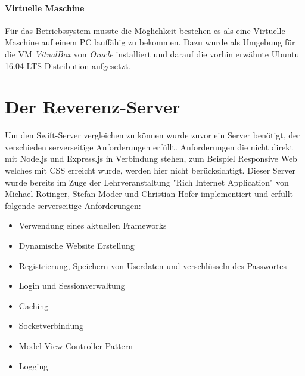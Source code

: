 \paragraph{Virtuelle Maschine}
Für das Betriebssystem musste die Möglichkeit bestehen es als eine Virtuelle Maschine auf einem PC lauffähig zu bekommen. Dazu wurde als Umgebung für die VM \textit{VitualBox} von \textit{Oracle} installiert und darauf die vorhin erwähnte Ubuntu 16.04 LTS Distribution aufgesetzt.

\section{Der Reverenz-Server}
\label{sec:derreverenzserver}

Um den Swift-Server vergleichen zu können wurde zuvor ein Server benötigt, der verschieden serverseitige Anforderungen erfüllt. Anforderungen die nicht direkt mit Node.js und Express.js in Verbindung stehen, zum Beispiel Responsive Web welches mit CSS erreicht wurde, werden hier nicht berücksichtigt. Dieser Server wurde bereits im Zuge der Lehrveranstaltung "Rich Internet Application" von Michael Rotinger, Stefan Moder und Christian Hofer implementiert und erfüllt folgende serverseitige Anforderungen: 
\begin{itemize}
	\item Verwendung eines aktuellen Frameworks
	\item Dynamische Website Erstellung
	\item Registrierung, Speichern von Userdaten und verschlüsseln des Passwortes
	\item Login und Sessionverwaltung
	\item Caching
	\item Socketverbindung
	\item Model View Controller Pattern
	\item Logging
\end{itemize}

